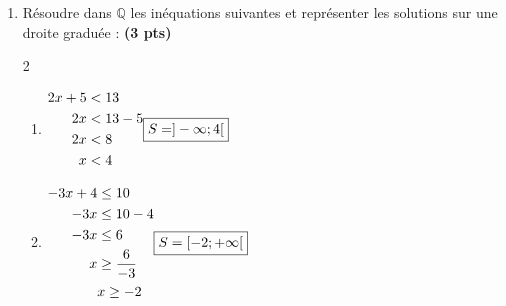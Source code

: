 \documentclass[12pt,a4paper]{article}
\begin{document}
\begin{enumerate}
    \item Résoudre dans $\mathbb{Q}$ les inéquations suivantes et représenter les solutions sur une droite graduée : \textbf{(3 pts)}
\begin{multicols}{2}
\setlength{\columnseprule}{0.1mm}
\begin{enumerate}
\item[]
\(
\begin{aligned}
2x + 5 &< 13\\
2x &< 13 - 5\\
2x &< 8\\
x &< 4\\
\end{aligned}\\
\boxed{S=]-\infty;4[}
\)
\item[]
\(
\begin{aligned}
-3x + 4 &\leq 10\\
-3x &\leq 10 - 4\\
-3x &\leq 6\\
x &\geq \frac{6}{-3} \\
& x \geq -2\\
\end{aligned}\\
\boxed{S=[-2;+\infty[}
\)
\end{enumerate}
\end{multicols}  
\end{enumerate}
\end{document}
